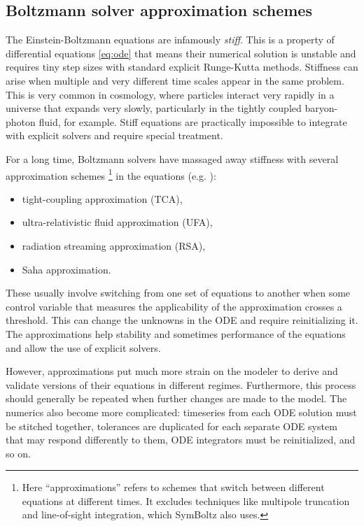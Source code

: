 \documentclass{aa}
\begin{document}
\subsection{Boltzmann solver approximation schemes}
\label{sec:intro_approximations}

The Einstein-Boltzmann equations are infamously \emph{stiff}.
This is a property of differential equations \eqref{eq:ode} that means their numerical solution is unstable and requires tiny step sizes with standard explicit Runge-Kutta methods.
Stiffness can arise when multiple and very different time scales appear in the same problem.
This is very common in cosmology, where particles interact very rapidly in a universe that expands very slowly, particularly in the tightly coupled baryon-photon fluid, for example.
Stiff equations are practically impossible to integrate with explicit solvers and require special treatment.

For a long time, Boltzmann solvers have massaged away stiffness with several approximation schemes%
\footnote{Here \enquote{approximations} refers to schemes that switch between different equations at different times. It excludes techniques like multipole truncation and line-of-sight integration, which SymBoltz also uses.}
in the equations (e.g. \cite{doranSpeedingCosmologicalBoltzmann2005,blasCosmicLinearAnisotropy2011a}):
\begin{itemize}
\item tight-coupling approximation (TCA),
\item ultra-relativistic fluid approximation (UFA),
\item radiation streaming approximation (RSA),
\item Saha approximation.
\end{itemize}
These usually involve switching from one set of equations to another when some control variable that measures the applicability of the approximation crosses a threshold.
This can change the unknowns in the ODE and require reinitializing it.
The approximations help stability and sometimes performance of the equations and allow the use of explicit solvers.

However, approximations put much more strain on the modeler to derive and validate versions of their equations in different regimes.
Furthermore, this process should generally be repeated when further changes are made to the model.
The numerics also become more complicated: timeseries from each ODE solution must be stitched together, tolerances are duplicated for each separate ODE system that may respond differently to them, ODE integrators must be reinitialized, and so on.
\end{document}
